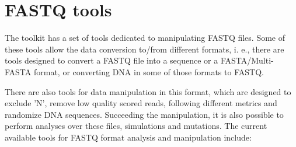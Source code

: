 \chapter{FASTQ tools}
\label{fastq}
The toolkit has a set of tools dedicated to manipulating FASTQ files. Some of these tools allow the data conversion to/from different formats, i. e., there are tools designed to convert a FASTQ file into a sequence or a FASTA/Multi-FASTA format, or converting DNA in some of those formats to FASTQ.

There are also tools for data manipulation in this format, which are designed to exclude 'N', remove low quality scored reads, following different metrics and randomize DNA sequences. Succeeding the manipulation, it is also possible to perform analyses over these files, simulations and mutations. The current available tools for FASTQ format analysis and manipulation include:
